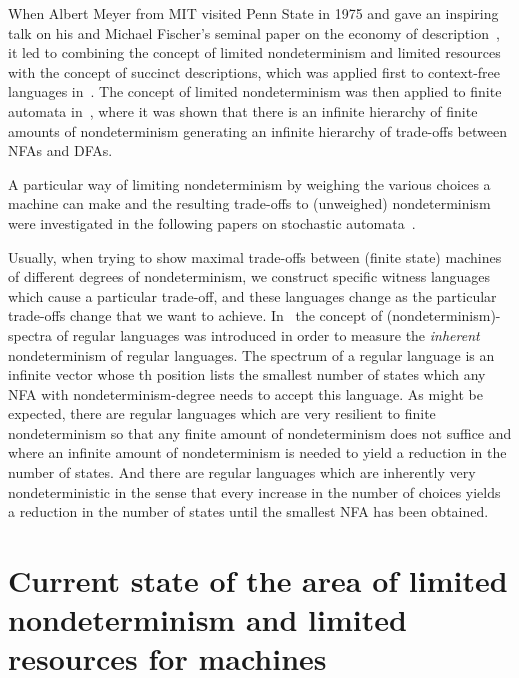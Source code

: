 \documentclass[copyright]{eptcs}
\begin{document}
When Albert Meyer from MIT visited Penn State in 1975 and gave an inspiring talk on his and Michael Fischer's seminal paper on
the economy of description~\cite{MeyerF71}, it led to combining the concept of limited nondeterminism and limited resources with 
the concept of succinct descriptions, which was applied first to context-free languages in~\cite{Kintala78}. The concept of
limited nondeterminism was then applied to finite automata in~\cite{KintalaW80}, where it was shown that there is an infinite hierarchy of
finite amounts of nondeterminism generating an infinite hierarchy of trade-offs between NFAs and DFAs.

A particular way of limiting nondeterminism by weighing the various choices a machine can make and the resulting trade-offs to (unweighed) 
nondeterminism were investigated in the following papers on stochastic automata~\cite{KintalaPW93,KintalaW86}. 

Usually, when trying to show maximal trade-offs between
(finite state) machines of different degrees of 
nondeterminism, we construct 
specific witness languages which cause a particular trade-off,
and these languages change as the particular trade-offs change
that we 
want to achieve. In~\cite{GoldstineKW90} the concept of 
(nondeterminism)-spectra of regular languages was introduced 
in order to measure the \emph{inherent}
 nondeterminism of regular languages. 
The spectrum of a regular language is an infinite vector whose 
th position lists the smallest number 
of states which any NFA with nondeterminism-degree  needs to accept this language. As might be expected, 
there are regular languages which are very resilient
to finite nondeterminism so that any finite amount of nondeterminism does not suffice 
and where an infinite amount of nondeterminism is needed to yield a reduction in the number of states. And there are regular languages which are 
inherently very nondeterministic in the sense that every increase in the number of choices yields a reduction in the number of 
states until the smallest NFA has been obtained.

\section{Current state of the area of limited nondeterminism and limited resources for machines}\label{s:spinoffs}
\end{document}
